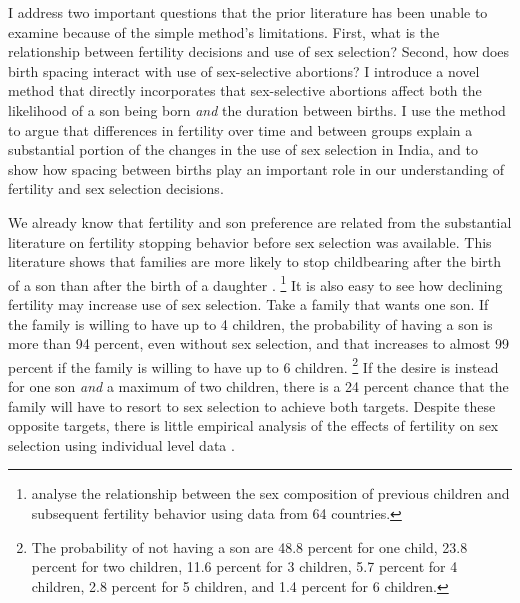 \documentclass[12pt,letterpaper]{article}
\begin{document}
I address two important questions that the prior literature has been unable
to examine because of the simple method's limitations.
First, what is the relationship between fertility decisions and use of sex selection?
Second, how does birth spacing interact with use of sex-selective abortions?
I introduce a novel method that directly incorporates that sex-selective 
abortions affect both the likelihood of a son being born \emph{and} the duration between 
births.
I use the method to argue that differences in fertility over time and between groups
explain a substantial portion of the changes in the use of sex selection in 
India, and to show how spacing between births play an important role in our understanding 
of fertility and sex selection decisions.

We already know that fertility and son preference are related from the substantial literature
on fertility stopping behavior before sex selection was available.
This literature shows that families are more likely to stop childbearing after the 
birth of a son than after the birth of a daughter
\cite[see, for example,][]{Das1987,Arnold1997,clark00}.%
\footnote{
\citet{filmer09} analyse the relationship between the sex composition of previous
children and subsequent fertility behavior using data from 64 countries.
}
It is also easy to see how declining fertility may increase use of sex selection.
Take a family that wants one son.
If the family is willing to have up to 4 children, the probability of having a son
is more than 94 percent, even without sex selection, and that increases to almost 99 
percent if the family is willing to have up to 6 children.%
\footnote{
The probability of not having a son are 48.8 percent for one child, 23.8 percent for
two children, 11.6 percent for 3 children, 5.7 percent for 4 children, 2.8 percent
for 5 children, and 1.4 percent for 6 children.
}
If the desire is instead for one son \emph{and} a maximum of two children, there 
is a 24 percent chance that the family will have to resort to sex selection to achieve 
both targets.
Despite these opposite targets, there is little empirical analysis of 
the effects of fertility on sex selection using individual level data 
\citep{park95,Ebenstein2011}.%
\end{document}
